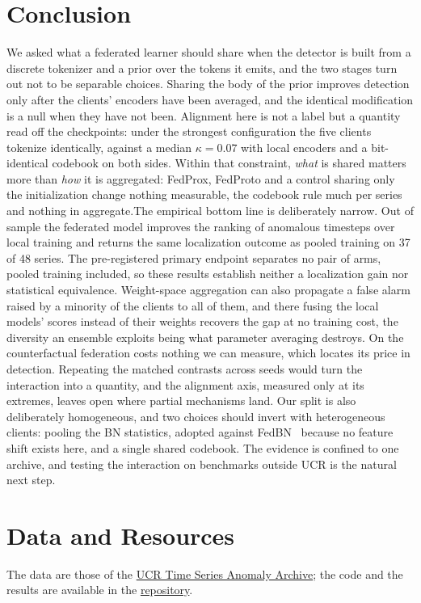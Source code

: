 \documentclass[conference]{IEEEtran}
\begin{document}
\section{Conclusion}
\label{sec:conclusion}

We asked what a federated learner should share when the detector is built from a discrete tokenizer
and a prior over the tokens it emits, and the two stages turn out not to be separable choices.
Sharing the body of the prior improves detection only after the clients' encoders have been
averaged, and the identical modification is a null when they have not been. Alignment here is not a
label but a quantity read off the checkpoints: under the strongest configuration the five clients
tokenize identically, against a median $\kappa=0.07$ with local encoders and a bit-identical
codebook on both sides. Within that constraint, \emph{what} is
shared matters more than \emph{how} it is aggregated: FedProx, FedProto and a control sharing only
the initialization change nothing measurable, the codebook rule much per series and nothing in
aggregate.The empirical bottom line is deliberately narrow. Out of sample the federated model improves the
ranking of anomalous timesteps over local training and returns the same localization outcome as
pooled training on 37 of 48 series. The pre-registered primary endpoint separates no pair of arms,
pooled training included, so these results establish neither a localization gain nor statistical
equivalence. Weight-space aggregation can also propagate a false alarm raised by a minority of
the clients to all of them, and there fusing the local models' scores instead of their weights
recovers the gap at no training cost, the diversity an ensemble exploits being what parameter
averaging destroys. On the counterfactual federation costs nothing we can measure, which locates its price in detection. Repeating the matched contrasts across seeds would turn the interaction into a quantity, and the
alignment axis, measured only at its extremes, leaves open where partial mechanisms land. Our split
is also deliberately homogeneous, and two choices should invert with heterogeneous clients: pooling
the BN statistics, adopted against FedBN~\cite{li2021fedbn} because no feature shift exists here,
and a single shared codebook. The evidence is confined to one archive, and testing the interaction
on benchmarks outside UCR is the natural next step.

\section*{Data and Resources}
The data are those of the \href{https://www.cs.ucr.edu/\%7Eeamonn/time_series_data_2018/UCR_TimeSeriesAnomalyDatasets2021.zip}{UCR Time Series Anomaly Archive}; the code and the results are available in the \href{https://github.com/lrdsch/FedTimeVQVAE-AD}{repository}.
\end{document}

